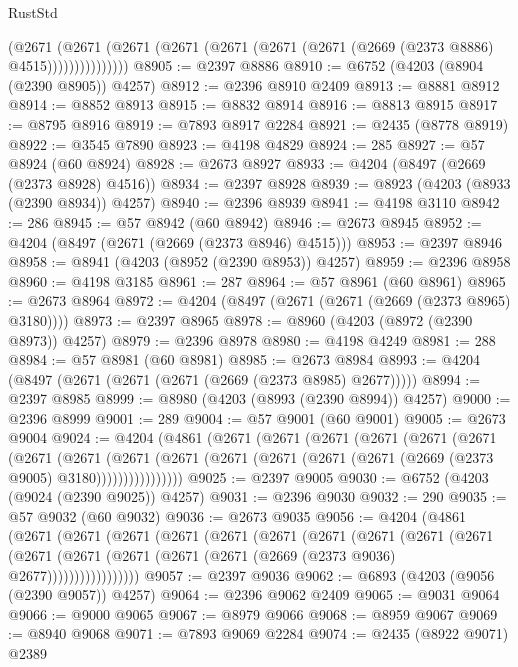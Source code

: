 \begin{lexlean}{RustStd}
\begin{coremodule}
                  (@2671
                    (@2671
                      (@2671 (@2671 (@2671 (@2671 (@2671 (@2669 (@2373 @8886) @4515)))))))))))))))
@8905 := @2397 @8886
@8910 := @6752 (@4203 (@8904 (@2390 @8905)) @4257)
@8912 := @2396 @8910 @2409
@8913 := @8881 @8912
@8914 := @8852 @8913
@8915 := @8832 @8914
@8916 := @8813 @8915
@8917 := @8795 @8916
@8919 := @7893 @8917 @2284
@8921 := @2435 (@8778 @8919)
@8922 := @3545 @7890
@8923 := @4198 @4829
@8924 := 285
@8927 := @57 @8924 (@60 @8924)
@8928 := @2673 @8927
@8933 := @4204 (@8497 (@2669 (@2373 @8928) @4516))
@8934 := @2397 @8928
@8939 := @8923 (@4203 (@8933 (@2390 @8934)) @4257)
@8940 := @2396 @8939
@8941 := @4198 @3110
@8942 := 286
@8945 := @57 @8942 (@60 @8942)
@8946 := @2673 @8945
@8952 := @4204 (@8497 (@2671 (@2669 (@2373 @8946) @4515)))
@8953 := @2397 @8946
@8958 := @8941 (@4203 (@8952 (@2390 @8953)) @4257)
@8959 := @2396 @8958
@8960 := @4198 @3185
@8961 := 287
@8964 := @57 @8961 (@60 @8961)
@8965 := @2673 @8964
@8972 := @4204 (@8497 (@2671 (@2671 (@2669 (@2373 @8965) @3180))))
@8973 := @2397 @8965
@8978 := @8960 (@4203 (@8972 (@2390 @8973)) @4257)
@8979 := @2396 @8978
@8980 := @4198 @4249
@8981 := 288
@8984 := @57 @8981 (@60 @8981)
@8985 := @2673 @8984
@8993 := @4204 (@8497 (@2671 (@2671 (@2671 (@2669 (@2373 @8985) @2677)))))
@8994 := @2397 @8985
@8999 := @8980 (@4203 (@8993 (@2390 @8994)) @4257)
@9000 := @2396 @8999
@9001 := 289
@9004 := @57 @9001 (@60 @9001)
@9005 := @2673 @9004
@9024 := @4204
    (@4861
      (@2671
        (@2671
          (@2671
            (@2671
              (@2671
                (@2671
                  (@2671
                    (@2671
                      (@2671
                        (@2671
                          (@2671 (@2671 (@2671 (@2671 (@2669 (@2373 @9005) @3180))))))))))))))))
@9025 := @2397 @9005
@9030 := @6752 (@4203 (@9024 (@2390 @9025)) @4257)
@9031 := @2396 @9030
@9032 := 290
@9035 := @57 @9032 (@60 @9032)
@9036 := @2673 @9035
@9056 := @4204
    (@4861
      (@2671
        (@2671
          (@2671
            (@2671
              (@2671
                (@2671
                  (@2671
                    (@2671
                      (@2671
                        (@2671
                          (@2671
                            (@2671 (@2671 (@2671 (@2671 (@2669 (@2373 @9036) @2677)))))))))))))))))
@9057 := @2397 @9036
@9062 := @6893 (@4203 (@9056 (@2390 @9057)) @4257)
@9064 := @2396 @9062 @2409
@9065 := @9031 @9064
@9066 := @9000 @9065
@9067 := @8979 @9066
@9068 := @8959 @9067
@9069 := @8940 @9068
@9071 := @7893 @9069 @2284
@9074 := @2435 (@8922 @9071) @2389

\end{coremodule}
\end{lexlean}
